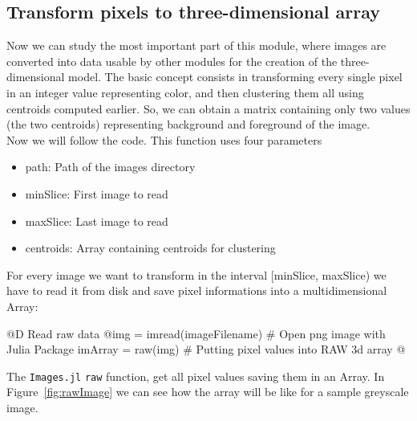 \documentclass[11pt,oneside]{article}	%
\begin{document}
\subsection{Transform pixels to three-dimensional array}\label{sec:transformation}

Now we can study the most important part of this module, where images are converted into data usable by other modules for the creation of the three-dimensional model. The basic concept consists in transforming every single pixel in an integer value representing color, and then clustering them all using centroids computed earlier. So, we can obtain a matrix containing only two values (the two centroids) representing background and foreground of the image.\\
Now we will follow the code. This function uses four parameters

\begin{itemize}
 \item path: Path of the images directory
 \item minSlice: First image to read
 \item maxSlice: Last image to read
 \item centroids: Array containing centroids for clustering
\end{itemize}

For every image we want to transform in the interval [minSlice, maxSlice) we have to read it from disk and save pixel informations into a multidimensional Array:

@D Read raw data
@{img = imread(imageFilename) # Open png image with Julia Package
imArray = raw(img) # Putting pixel values into RAW 3d array @}

The \texttt{Images.jl} \texttt{raw} function, get all pixel values saving them in an Array. In Figure~\ref{fig:rawImage} we can see how the array will be like for a sample greyscale image.
\end{document}
